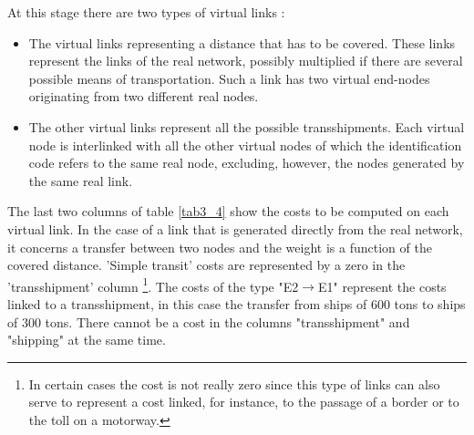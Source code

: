 At this stage there are two types of virtual links :

\begin{itemize}
\item The virtual links representing a distance that has to be covered.
These links represent the links of the real network, possibly multiplied if
there are several possible means of transportation.  Such a link has two virtual
end-nodes originating from two different real nodes.
\item The other virtual links represent all the possible transshipments.
Each virtual node is interlinked with all the other virtual nodes of which the
identification code refers to the same real node, excluding, however, the nodes
generated by the same real link.
\end{itemize}


The last two columns of table \ref{tab3_4} show the costs to be computed on each
virtual link.  In the case of a link that is generated directly from the real
network, it concerns a transfer between two nodes and the weight is a function
of the covered distance.  'Simple transit' costs are represented by a zero in the 'transshipment' column \footnote {In certain cases the cost
is not really zero since this type of links can also serve to represent a cost
linked, for instance, to the passage of a border or to the toll on a motorway.}.
The costs of the type "E2$\rightarrow$E1" represent the costs linked to a
transshipment, in this case the transfer from ships of 600 tons to ships of 300
tons.  There cannot be a cost in the columns "transshipment" and "shipping" at
the same time.


